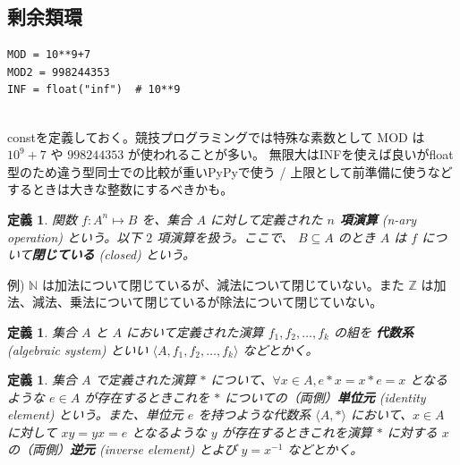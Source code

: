 \documentclass[12pt, a4j]{ltjsarticle}
\newtheorem{defi}[thm]{定義}
\begin{document}
\subsection{剰余類環}

\begin{lstlisting}
MOD = 10**9+7
MOD2 = 998244353
INF = float("inf")  # 10**9
\end{lstlisting}
\quad\\
constを定義しておく。競技プログラミングでは特殊な素数として MOD は $10^9+7$ や $998244353$ が使われることが多い。 無限大はINFを使えば良いがfloat型のため違う型同士での比較が重いPyPyで使う / 上限として前準備に使うなどするときは大きな整数にするべきかも。

\vspace{1cm}

\begin{defi}
関数 $f: A^n\longmapsto B$ を、集合 $A$ に対して定義された {\bf \mbox{\boldmath $n$} 項演算} (n-ary operation) という。以下 $2$ 項演算を扱う。ここで、 $B \subseteq A$ のとき $A$ は $f$ について{\bf 閉じている} (closed) という。
\end{defi}

例) $\mathbb{N}$ は加法について閉じているが、減法について閉じていない。また $\mathbb{Z}$ は加法、減法、乗法について閉じているが除法について閉じていない。

\vspace{1cm}

\begin{defi}
集合 $A$ と $A$ において定義された演算 $f_1, f_2, \ldots, f_k$ の組を {\bf 代数系} (algebraic system) といい $\langle A, f_1, f_2, \ldots, f_k \rangle$ などとかく。
\end{defi}

\vspace{1cm}

\begin{defi}
集合 $A$ で定義された演算 $*$ について、$\forall x\in A, e*x=x*e=x$ となるような $e\in A$ が存在するときこれを $*$ についての（両側）{\bf 単位元} (identity element) という。また、単位元 $e$ を持つような代数系 $\langle A, * \rangle$ において、$x\in A$ に対して $xy=yx=e$ となるような $y$ が存在するときこれを演算 $*$ に対する $x$ の（両側）{\bf 逆元} (inverse element) とよび $y=x^{-1}$ などとかく。
\end{defi}

\vspace{1cm}
\end{document}

